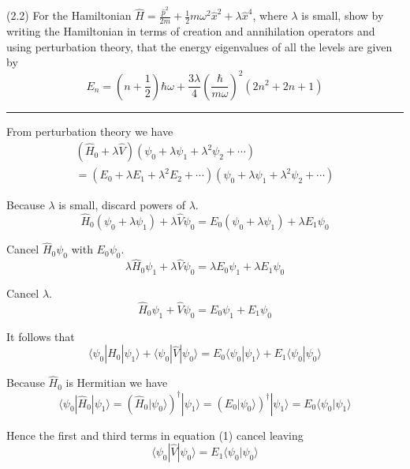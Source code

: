 \documentclass[12pt]{article}
\begin{document}
(2.2)
For the Hamiltonian
$\hat H=\frac{\hat p^2}{2m}+\frac{1}{2}m\omega^2\hat x^2+\lambda\hat x^4$,
where $\lambda$ is small, show by writing the Hamiltonian
in terms of creation and annihilation operators and
using perturbation theory, that the energy eigenvalues
of all the levels are given by
\begin{equation*}
E_n=\left(n+\frac{1}{2}\right)\hbar\omega
+\frac{3\lambda}{4}\left(\frac{\hbar}{m\omega}\right)^2
\left(2n^2+2n+1\right)
\tag{2.67}
\end{equation*}

\bigskip
\hrule

\bigskip
From perturbation theory we have
\begin{multline*}
\left(\hat H_0+\lambda\hat V\right)\left(\psi_0+\lambda\psi_1+\lambda^2\psi_2+\cdots\right)
\\
=\left(E_0+\lambda E_1+\lambda^2 E_2+\cdots\right)\left(\psi_0+\lambda\psi_1+\lambda^2\psi_2+\cdots\right)
\end{multline*}

Because $\lambda$ is small, discard powers of $\lambda$.
\begin{equation*}
\hat H_0(\psi_0+\lambda\psi_1)+\lambda \hat V\psi_0=E_0(\psi_0+\lambda\psi_1)+\lambda E_1\psi_0
\end{equation*}

Cancel $\hat H_0\psi_0$ with $E_0\psi_0$.
\begin{equation*}
\lambda\hat H_0\psi_1+\lambda \hat V\psi_0=\lambda E_0\psi_1+\lambda E_1\psi_0
\end{equation*}

Cancel $\lambda$.
\begin{equation*}
\hat H_0\psi_1+\hat V\psi_0=E_0\psi_1+E_1\psi_0
\end{equation*}

It follows that
\begin{equation*}
\langle\psi_0|\hat H_0|\psi_1\rangle
+\langle\psi_0|\hat V|\psi_0\rangle
=E_0\langle\psi_0|\psi_1\rangle
+E_1\langle\psi_0|\psi_0\rangle
\tag{1}
\end{equation*}

Because $\hat H_0$ is Hermitian we have
\begin{equation*}
\langle\psi_0|\hat H_0|\psi_1\rangle
=\left(\hat H_0|\psi_0\rangle\right)^\dag|\psi_1\rangle
=\left(E_0|\psi_0\rangle\right)^\dag|\psi_1\rangle
=E_0\langle\psi_0|\psi_1\rangle
\end{equation*}

Hence the first and third terms in equation (1) cancel leaving
\begin{equation*}
\langle\psi_0|\hat V|\psi_0\rangle
=E_1\langle\psi_0|\psi_0\rangle
\end{equation*}
\end{document}
